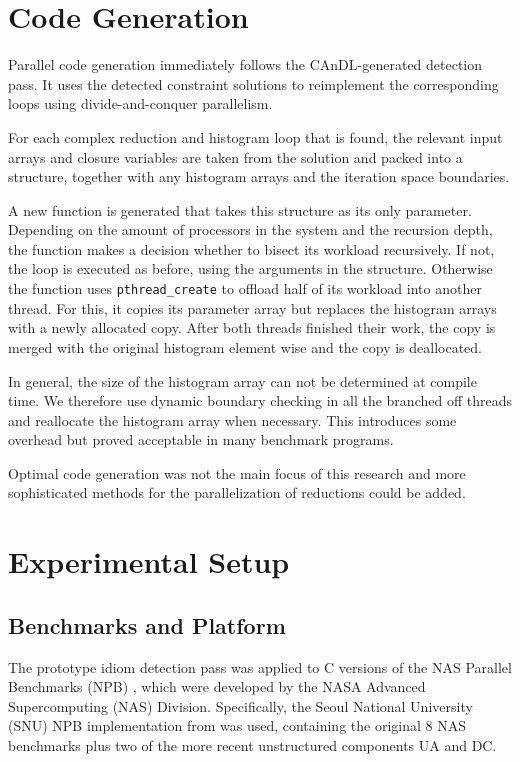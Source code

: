 \section{Code Generation}

    Parallel code generation immediately follows the CAnDL-generated detection
    pass.
    It uses the detected constraint solutions to reimplement the corresponding
    loops using divide-and-conquer parallelism.

    For each complex reduction and histogram loop that is found, the relevant
    input arrays and closure variables are taken from the solution and packed
    into a structure, together with any histogram arrays and the iteration
    space boundaries.

    A new function is generated that takes this structure as its only parameter.
    Depending on the amount of processors in the system and the recursion
    depth, the function makes a decision whether to bisect its workload
    recursively.
    If not, the loop is executed as before, using the arguments in the
    structure.
    Otherwise the function uses \texttt{pthread\_create} to offload half of its
    workload into another thread.
    For this, it copies its parameter array but replaces the histogram arrays
    with a newly allocated copy.
    After both threads finished their work, the copy is merged with the original
    histogram element wise and the copy is deallocated.

    In general, the size of the histogram array can not be determined at
    compile time.
    We therefore use dynamic boundary checking in all the branched off threads
    and reallocate the histogram array when necessary.
    This introduces some overhead but proved acceptable in many benchmark
    programs.

    Optimal code generation was not the main focus of this research and more
    sophisticated methods for the parallelization of reductions could be added.

\section{Experimental Setup}

\subsection{Benchmarks and Platform}

    The prototype idiom detection pass was applied to C versions of the
    NAS Parallel Benchmarks (NPB) \citep{Bailey1991NPB}, which were developed
    by the NASA Advanced Supercomputing (NAS) Division.
    Specifically, the Seoul National University (SNU) NPB implementation from
    \citet{seo2011performance} was used, containing the original 8 NAS
    benchmarks plus two of the more recent unstructured components UA and DC.

